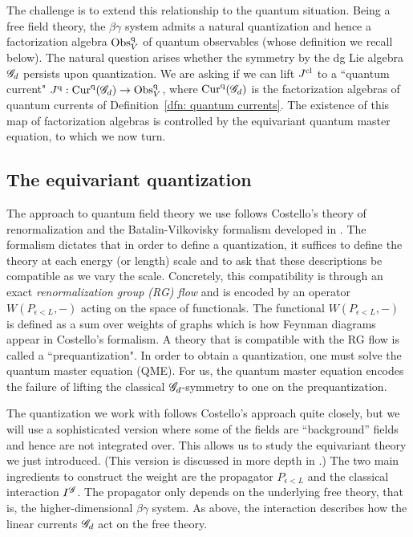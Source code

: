The challenge is to extend this relationship to the quantum situation. 
Being a free field theory, the $\beta\gamma$ system admits a natural quantization and hence a factorization algebra ${\rm Obs}^{{\rm q}}_V$ of quantum observables (whose definition we recall below). 
The natural question arises whether the symmetry by the dg Lie algebra $\mathscr G_d$ persists upon quantization. 
We are asking if we can lift $J^{{\rm cl}}$ to a ``quantum current" $J^{{\rm q}} : {\rm Cur}^{\rm q}(\mathscr G_d) \to {\rm Obs}^{\rm q}_V$, where ${\rm Cur}^{\rm q}(\mathscr G_d)$ is the factorization algebras of quantum currents of Definition~\ref{dfn: quantum currents}. 
The existence of this map of factorization algebras is controlled by the equivariant quantum master equation, to which we now turn.

\subsection{The equivariant quantization}

The approach to quantum field theory we use follows Costello's theory of renormalization and the Batalin-Vilkovisky formalism developed in \cite{CosRenorm}.
The formalism dictates that in order to define a quantization, it suffices to define the theory at each energy (or length) scale and to ask that these descriptions be compatible as we vary the scale.
Concretely, this compatibility is through an exact {\em renormalization group (RG) flow} and is encoded by an operator $W(P_{\epsilon < L}, -)$ acting on the space of functionals. 
The functional $W(P_{\epsilon < L},-)$ is defined as a sum over weights of graphs which is how Feynman diagrams appear in Costello's formalism.
A theory that is compatible with the RG flow is called a ``prequantization". 
In order to obtain a quantization, one must solve the quantum master equation (QME). 
For us, the quantum master equation encodes the failure of lifting the classical $\mathscr G_d$-symmetry to one on the prequantization.

The quantization we work with follows Costello's approach quite closely, 
but we will use a sophisticated version where some of the fields are ``background'' fields and hence are not integrated over.
This allows us to study the equivariant theory we just introduced.
(This version is discussed in more depth in \cite{CG2}.) 
The two main ingredients to construct the weight are the propagator $P_{\epsilon < L}$ and the classical interaction $I^{\mathscr G}$. 
The propagator only depends on the underlying free theory, that is, the higher-dimensional $\beta\gamma$ system. 
As above, the interaction describes how the linear currents $\mathscr G_d$ act on the free theory. 

